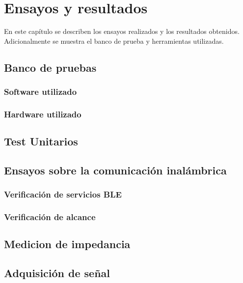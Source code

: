 
\chapter{Ensayos y resultados} %

\label{Chapter4} 
En este capítulo se describen los ensayos realizados y los resultados obtenidos. Adicionalmente se muestra el banco de prueba y herramientas utilizadas.

\section{Banco de pruebas}

\subsection{Software utilizado}

\subsection{Hardware utilizado}

\section{Test Unitarios}

\section{Ensayos sobre la comunicación inalámbrica}

\subsection{Verificación de servicios BLE}

\subsection{Verificación de alcance}

\section{Medicion de impedancia}

\section{Adquisición de señal}

